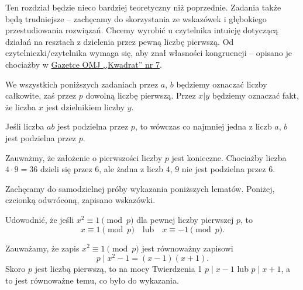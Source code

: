 



\noindent
Ten rozdział będzie nieco bardziej teoretyczny niż poprzednie. Zadania także będą trudniejsze -- zachęcamy do skorzystania ze wskazówek i głębokiego przestudiowania rozwiązań. Chcemy wyrobić u czytelnika intuicję dotyczącą działań na resztach z dzielenia przez pewną liczbę pierwszą. Od czytelniczki/czytelnika wymaga się, aby znał własności kongruencji -- opisano je chociażby w  \href{https://omj.edu.pl/uploads/attachments/kwadrat-07-kolor.pdf}{Gazetce OMJ ,,Kwadrat'' nr 7}. 

\vspace{5px}

\noindent
We wszystkich poniższych zadaniach przez $a$, $b$ będziemy oznaczać liczby całkowite, zaś przez $p$ dowolną liczbę pierwszą. Przez $x \big| y$ będziemy oznaczać fakt, że liczba $x$ jest dzielnikiem liczby $y$.

\vspace{5px}

\noindent
Jeśli liczba $ab$ jest podzielna przez $p$, to wówczas co najmniej jedna z liczb $a$, $b$ jest podzielna przez $p$.

\vspace{15px}

\noindent
Zauważmy, że założenie o pierwszości liczby $p$ jest konieczne. Chociażby liczba $4 \cdot 9 = 36$ dzieli się przez $6$, ale żadna z liczb $4$, $9$ nie jest podzielna przez $6$.

\vspace{5px}
\noindent
Zachęcamy do samodzielnej próby wykazania poniższych lematów. Poniżej, czcionką odwróconą, zapisano wskazówki.

\vspace{5px}

\noindent
Udowodnić, że jeśli $x^2\equiv 1 \pmod{p}$ dla pewnej liczby pierwszej $p$, to \[   
    x\equiv 1 \pmod{p} \quad \text{lub} \quad x\equiv -1 \pmod{p}.
\]



\noindent
Zauważamy, że zapis $x^2\equiv 1 \pmod{p}$ jest równoważny zapisowi 
\[
    p \mid x^2-1=(x-1)(x+1).
\]
 Skoro $p$ jest liczbą pierwszą, to na mocy Twierdzenia 1 $p\mid x-1$ lub $p\mid x+1$, a to jest równoważne temu, co było do wykazania.

